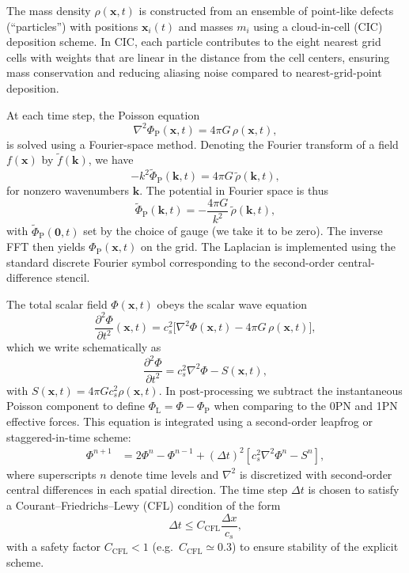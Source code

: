 \documentclass[11pt]{article}
\newcommand{\cS}{c_s}
\newcommand{\PhiP}{\Phi_{\mathrm{P}}}
\newcommand{\PhiL}{\Phi_{\mathrm{L}}}
\begin{document}
The mass density $\rho(\mathbf{x},t)$ is constructed from an ensemble of point-like defects (``particles'') with positions $\mathbf{x}_i(t)$ and masses $m_i$ using a cloud-in-cell (CIC) deposition scheme. In CIC, each particle contributes to the eight nearest grid cells with weights that are linear in the distance from the cell centers, ensuring mass conservation and reducing aliasing noise compared to nearest-grid-point deposition.

At each time step, the Poisson equation
\begin{equation}
  \nabla^2 \PhiP(\mathbf{x},t) = 4\pi G\,\rho(\mathbf{x},t),
\end{equation}
is solved using a Fourier-space method. Denoting the Fourier transform of a field $f(\mathbf{x})$ by $\tilde{f}(\mathbf{k})$, we have
\begin{equation}
  -k^2 \tilde{\Phi}_{\mathrm{P}}(\mathbf{k},t)
  = 4\pi G\,\tilde{\rho}(\mathbf{k},t),
\end{equation}
for nonzero wavenumbers $\mathbf{k}$. The potential in Fourier space is thus
\begin{equation}
  \tilde{\Phi}_{\mathrm{P}}(\mathbf{k},t)
  = -\frac{4\pi G}{k^2}\,\tilde{\rho}(\mathbf{k},t),
\end{equation}
with $\tilde{\Phi}_{\mathrm{P}}(\mathbf{0},t)$ set by the choice of gauge (we take it to be zero). The inverse FFT then yields $\PhiP(\mathbf{x},t)$ on the grid. The Laplacian is implemented using the standard discrete Fourier symbol corresponding to the second-order central-difference stencil.

The total scalar field $\Phi(\mathbf{x},t)$ obeys the scalar wave equation
\begin{equation}
  \frac{\partial^2 \Phi}{\partial t^2}(\mathbf{x},t)
  = \cS^2 \bigl[\nabla^2 \Phi(\mathbf{x},t) - 4\pi G\,\rho(\mathbf{x},t)\bigr],
\end{equation}
which we write schematically as
\begin{equation}
  \frac{\partial^2 \Phi}{\partial t^2}
  = \cS^2 \nabla^2 \Phi - S(\mathbf{x},t),
\end{equation}
with $S(\mathbf{x},t) = 4\pi G \cS^2 \rho(\mathbf{x},t)$. In post-processing we subtract the instantaneous Poisson component to define $\PhiL = \Phi - \PhiP$ when comparing to the 0PN and 1PN effective forces. This equation is integrated using a second-order leapfrog or staggered-in-time scheme:
\begin{align}
  \Phi^{n+1}
  &= 2\Phi^n - \Phi^{n-1}
   + (\Delta t)^2 \left[
       \cS^2 \nabla^2 \Phi^n - S^n
     \right],
\end{align}
where superscripts $n$ denote time levels and $\nabla^2$ is discretized with second-order central differences in each spatial direction. The time step $\Delta t$ is chosen to satisfy a Courant–Friedrichs–Lewy (CFL) condition of the form
\begin{equation}
  \Delta t \le C_{\mathrm{CFL}} \frac{\Delta x}{\cS},
\end{equation}
with a safety factor $C_{\mathrm{CFL}} < 1$ (e.g.\ $C_{\mathrm{CFL}} \simeq 0.3$) to ensure stability of the explicit scheme.
\end{document}
